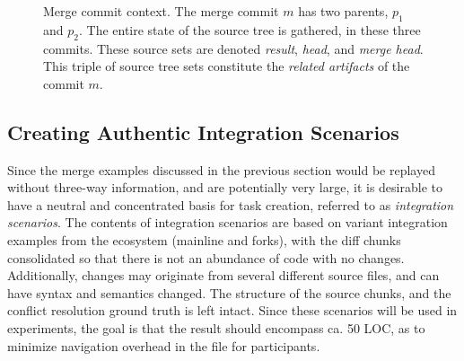 \begin{figure}[ht]
    \centering
    \caption{Merge commit context. The merge commit $m$ has two parents, $p_1$ and $p_2$. The entire state of the source tree is gathered, in these three commits. These source sets are denoted \textit{result}, \textit{head}, and \textit{merge head}. This triple of source tree sets constitute the \textit{related artifacts} of the commit $m$.}
    \label{intentions:mergespace}
\end{figure}

\subsection{Creating Authentic Integration Scenarios}
Since the merge examples discussed in the previous section would be replayed without three-way information, and are potentially very large, it is desirable to have a neutral and concentrated basis for task creation, referred to as \textit{integration scenarios}. The contents of integration scenarios are based on variant integration examples from the ecosystem (mainline and forks), with the diff chunks consolidated so that there is not an abundance of code with no changes. Additionally, changes may originate from several different source files, and can have syntax and semantics changed. The structure of the source chunks, and the conflict resolution ground truth is left intact. Since these scenarios will be used in experiments, the goal is that the result should encompass ca. 50 LOC, as to minimize navigation overhead in the file for participants.

